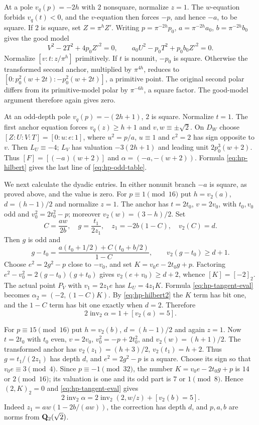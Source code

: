 At a pole $v_q(p)=-2h$ with $2$ nonsquare, normalize $z=1$.
The $w$-equation forbids $v_q(t)<0$, and the $v$-equation then
forces $-p$, and hence $-a$, to be square.  If $2$ is square, set
$Z=\pi^hZ'$.  Writing $p=\pi^{-2h}p_0$, $a=\pi^{-2h}a_0$,
$b=\pi^{-2h}b_0$ gives the good model
\[
 V^2-2T^2+4p_0Z'^2=0,\qquad
 a_0U^2-p_0T^2+p_0b_0Z'^2=0.
\]
Normalize $[v:t:z/\pi^h]$ primitively.  If $t$ is nonunit, $-p_0$
is square.  Otherwise the transformed second anchor, multiplied by
$\pi^{4h}$, reduces to
$[0:p_0^2(w+2t):-p_0^2(w+2t)]$, a primitive point.
The original second polar differs from its primitive-model polar by
$\pi^{-6h}$, a square factor.  The good-model argument therefore
again gives zero.

At an odd-depth pole $v_q(p)=-(2h+1)$, $2$ is square.  Normalize $t=1$.
The first anchor equation forces $v_q(z)\ge h+1$ and
$v,w\equiv\pm\sqrt2$.  On $D_W$ choose
$[Z:U:V:T]=[0:u:e:1]$, where $u^2=p/a$, $u\equiv1$ and
$e^2=2$ has sign opposite to $v$.
Then $L_U\equiv-4$; $L_V$ has valuation $-3(2h+1)$ and leading
unit $2p_0^3(w+2)$.  Thus $[F]=[(-a)(w+2)]$ and
$\alpha=(-a,-(w+2))$.  Formula \eqref{eq:hp-hilbert} gives the last
line of \eqref{eq:hp-odd-table}.

We next calculate the dyadic entries.  In either nonunit branch $-a$
is square, as proved above, and the value is zero.
For $p\equiv1\pmod {16}$ put $h=v_2(a)$, $d=(h-1)/2$ and normalize
$z=1$.  The anchor has $t=2t_0$, $v=2v_0$, with $t_0,v_0$ odd and
$v_0^2=2t_0^2-p$; moreover $v_2(w)=(3-h)/2$.
Set
\[
 C=\frac{aw}{2b},\quad g=\frac{t_1}{2z_1},\quad
 z_1=-2b(1-C),\quad v_2(C)=d.
\]
Then $g$ is odd and
\[
 g-t_0=\frac{a(t_0+1/2)+C(t_0+b/2)}{1-C},\qquad
 v_2(g-t_0)\ge d+1.
\]
Choose $e^2=2g^2-p$ close to $-v_0$, and set
$K=v_0e-2t_0g+p$.  Factoring
$e^2-v_0^2=2(g-t_0)(g+t_0)$ gives
$v_2(e+v_0)\ge d+2$, whence $[K]=[-2]_2$.
The actual point $P_V$ with $v_1=2z_1e$ has $L_U=4z_1K$.
Formula \eqref{eq:hp-tangent-eval} becomes
$\alpha_2=(-2,(1-C)K)$.
By \eqref{eq:hp-hilbert2} the $K$ term has bit one, and the
$1-C$ term has bit one exactly when $d=2$.  Therefore
\begin{equation}\label{eq:hp-dyadic-one}
 2\operatorname{inv}_2\alpha=1+[v_2(a)=5].
\end{equation}

For $p\equiv15\pmod {16}$ put $h=v_2(b)$, $d=(h-1)/2$ and again
$z=1$.  Now $t=2t_0$ with $t_0$ even, $v=2v_0$,
$v_0^2=-p+2t_0^2$, and $v_2(w)=(h+1)/2$.
The transformed anchor has
$v_2(z_1)=(h+3)/2$, $v_2(t_1)=h+2$.
Thus $g=t_1/(2z_1)$ has depth $d$, and $e^2=2g^2-p$ is a square.
Choose its sign so that $v_0e\equiv3\pmod4$.
Since $p\equiv-1\pmod {32}$, the number
$K=v_0e-2t_0g+p$ is $14$ or $2\pmod {16}$; its valuation is one
and its odd part is $7$ or $1\pmod8$.
Hence $(2,K)_2=0$ and \eqref{eq:hp-tangent-eval} gives
\begin{equation}\label{eq:hp-dyadic-minus}
 2\operatorname{inv}_2\alpha
 =2\operatorname{inv}_2(2,w/z)+[v_2(b)=5].
\end{equation}
Indeed $z_1=aw(1-2b/(aw))$, the correction has depth $d$, and
$p,a,b$ are norms from $\mathbf Q_2(\sqrt2)$.

